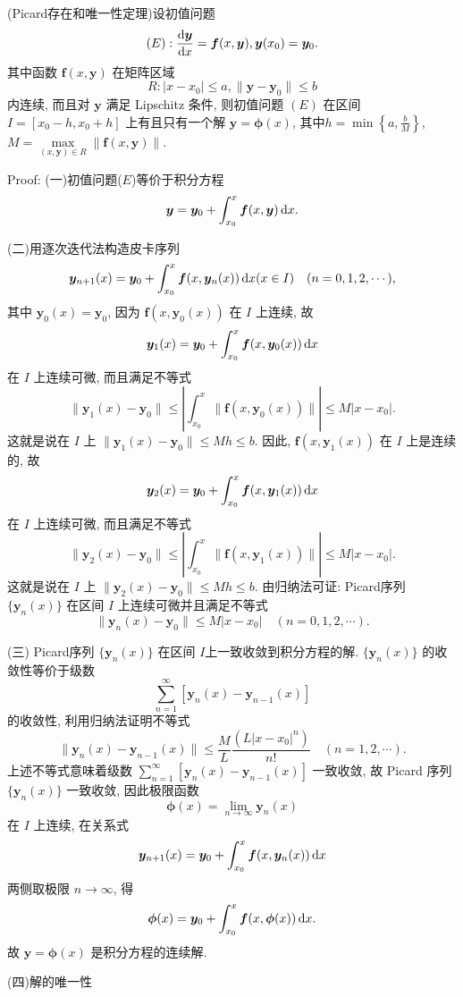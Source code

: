 \begin{solve}
  (Picard存在和唯一性定理)设初值问题
  \[(E):\frac{\mathop{}\!\mathrm{d}\bm{y}}{\mathop{}\!\mathrm{d} x}=\bm{f}(x,\bm{y}),\bm{y}(x_0)=\bm{y}_0.\]
  其中函数 $\bm{f}(x,\bm{y})$ 在矩阵区域
  \[R:|x-x_0|\leq a,\|\bm{y}-\bm{y}_0\|\leq b\]
  内连续, 而且对 $\bm{y}$ 满足 Lipschitz 条件, 则初值问题 $(E)$ 在区间 $I=[x_0-h,x_0+h]$
  上有且只有一个解 $\bm{y}=\bm{\phi}(x)$, 
  其中$\displaystyle h=\min\left\{a,\frac{b}{M}\right\}$, 
  $M=\max\limits_{(x,\bm{y})\in R}\|\bm{f}(x,\bm{y})\|$.

  Proof:
  (一)初值问题($E$)等价于积分方程
  \[\bm{y}=\bm{y}_0+\int_{x_0}^x\bm{f}(x,\bm{y})\mathop{}\!\mathrm{d} x.\]

  (二)用逐次迭代法构造皮卡序列
  \[\bm{y}_{n+1}(x)=\bm{y}_0+\int_{x_0}^x\bm{f}(x,\bm{y}_n(x))\mathop{}\!\mathrm{d} x(x\in I)\quad (n=0,1,2,\cdots),\]
  其中 $\bm{y}_0(x)=\bm{y}_0$, 因为 $\bm{f}(x,\bm{y}_0(x))$ 在 $I$ 上连续, 故
  \[\bm{y}_1(x)=\bm{y}_0+\int_{x_0}^x\bm{f}(x,\bm{y}_0(x))\mathop{}\!\mathrm{d} x\]
  在 $I$ 上连续可微, 而且满足不等式
  \[\|\bm{y}_1(x)-\bm{y}_0\|\leq\left|\int_{x_0}^x\|\bm{f}(x,\bm{y}_0(x))\|\right|\leq M|x-x_0|.\]
  这就是说在 $I$ 上 $\|\bm{y}_1(x)-\bm{y}_0\|\leq Mh\leq b$.
  因此, $\bm{f}(x,\bm{y}_1(x))$ 在 $I$ 上是连续的, 故
  \[\bm{y}_2(x)=\bm{y}_0+\int_{x_0}^x\bm{f}(x,\bm{y}_1(x))\mathop{}\!\mathrm{d} x\]
  在 $I$ 上连续可微, 而且满足不等式
  \[\|\bm{y}_2(x)-\bm{y}_0\|\leq\left|\int_{x_0}^x\|\bm{f}(x,\bm{y}_1(x))\|\right|\leq M|x-x_0|.\]
  这就是说在 $I$ 上 $\|\bm{y}_2(x)-\bm{y}_0\|\leq Mh\leq b$.
  由归纳法可证: Picard序列 $\{\bm{y}_n(x)\}$ 在区间 $I$ 上连续可微并且满足不等式
  \[\|\bm{y}_n(x)-\bm{y}_0\|\leq M|x-x_0|\quad(n=0,1,2,\cdots).\]

  (三) Picard序列 $\{\bm{y}_n(x)\}$ 在区间 $I$上一致收敛到积分方程的解.
  $\{\bm{y}_n(x)\}$ 的收敛性等价于级数
  \[\sum_{n=1}^{\infty}[\bm{y}_{n}(x)-\bm{y}_{n-1}(x)]\]
  的收敛性, 利用归纳法证明不等式
  \[\|\bm{y}_n(x)-\bm{y}_{n-1}(x)\|\leq\frac{M}{L}\frac{(L|x-x_0|^n)}{n!}\quad (n=1,2,\cdots).\]
  上述不等式意味着级数 $\sum\limits_{n=1}^{\infty}[\bm{y}_{n}(x)-\bm{y}_{n-1}(x)]$ 一致收敛, 
  故 Picard 序列 $\{\bm{y}_n(x)\}$ 一致收敛, 因此极限函数
  \[\bm{\phi}(x)=\lim_{n\to\infty}\bm{y}_n(x)\]
  在 $I$ 上连续, 在关系式
  \[\bm{y}_{n+1}(x)=\bm{y}_0+\int_{x_0}^x\bm{f}(x,\bm{y}_n(x))\mathop{}\!\mathrm{d} x\]
  两侧取极限 $n\to\infty$, 得
  \[\bm{\phi}(x)=\bm{y}_0+\int_{x_0}^x\bm{f}(x,\bm{\phi}(x))\mathop{}\!\mathrm{d} x.\]
  故 $\bm{y}=\bm{\phi}(x)$ 是积分方程的连续解.

  (四)解的唯一性


\end{solve}
